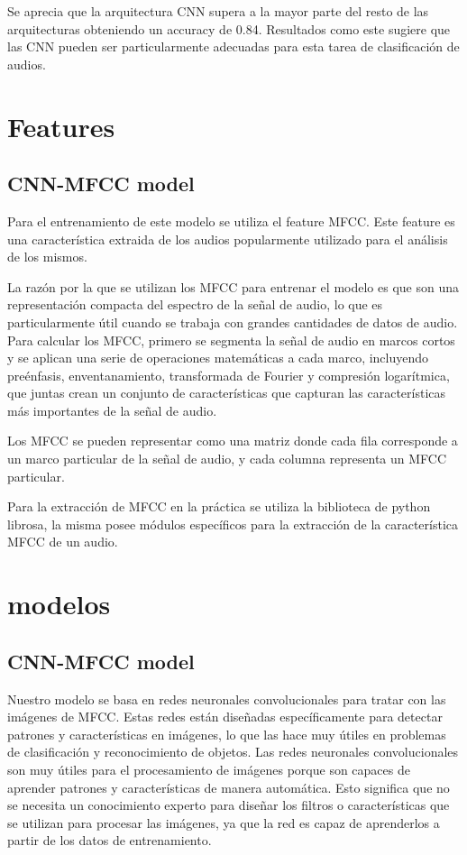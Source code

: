 \documentclass[colorinlistoftodos,twoside,twocolumn,10pt]{article} %
\begin{document}
Se aprecia que la arquitectura CNN supera a la mayor parte del resto de las arquitecturas obteniendo un accuracy de 0.84.
Resultados como este sugiere que las CNN pueden ser particularmente adecuadas para esta tarea de clasificaci\'on de audios.

\section {Features}
\subsection {CNN-MFCC model}
Para el entrenamiento de este modelo se utiliza el feature MFCC. Este feature es una caracter\'istica extraida de los audios popularmente utilizado para el an\'alisis de los mismos.

La razón por la que se utilizan los MFCC para entrenar el modelo es que son una representación compacta del espectro de la señal de audio, lo que es particularmente útil cuando se trabaja con grandes cantidades de datos de audio. Para calcular los MFCC, primero se segmenta la señal de audio en marcos cortos y se aplican una serie de operaciones matemáticas a cada marco, incluyendo preénfasis, enventanamiento, transformada de Fourier y compresión logarítmica, que juntas crean un conjunto de características que capturan las características más importantes de la señal de audio.

Los MFCC se pueden representar como una matriz donde cada fila corresponde a un marco particular de la señal de audio, y cada columna representa un MFCC particular.

Para la extracci\'on de MFCC en la pr\'actica se utiliza la biblioteca de python librosa, la misma posee m\'odulos espec\'ificos para la extracci\'on de la caracter\'istica MFCC de un audio.

\section{modelos}
\subsection {CNN-MFCC model}
Nuestro modelo se basa en redes neuronales convolucionales para tratar con las imágenes de MFCC. Estas redes están diseñadas específicamente para detectar patrones y características en imágenes, lo que las hace muy útiles en problemas de clasificación y reconocimiento de objetos. Las redes neuronales convolucionales son muy útiles para el procesamiento de imágenes porque son capaces de aprender patrones y características de manera automática. Esto significa que no se necesita un conocimiento experto para diseñar los filtros o características que se utilizan para procesar las imágenes, ya que la red es capaz de aprenderlos a partir de los datos de entrenamiento.
\end{document}
